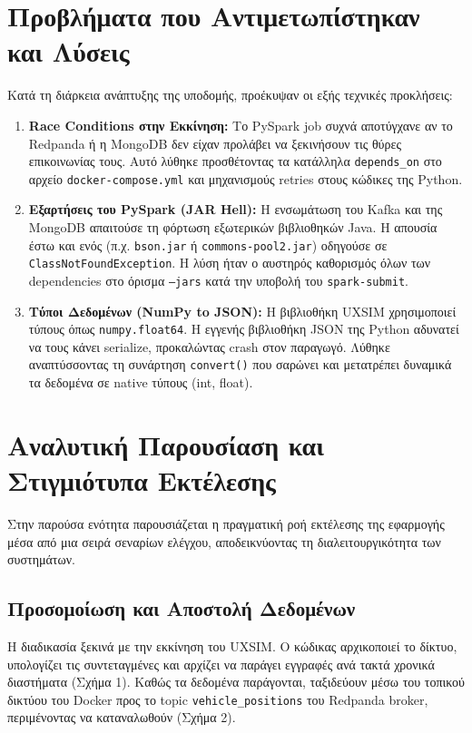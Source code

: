 \documentclass[11pt,a4paper]{article}
\begin{document}
\section{Προβλήματα που Αντιμετωπίστηκαν και Λύσεις}
Κατά τη διάρκεια ανάπτυξης της υποδομής, προέκυψαν οι εξής τεχνικές προκλήσεις:
\begin{enumerate}
    \item \textbf{Race Conditions στην Εκκίνηση:} Το PySpark job συχνά αποτύγχανε αν το Redpanda ή η MongoDB δεν είχαν προλάβει να ξεκινήσουν τις θύρες επικοινωνίας τους. Αυτό λύθηκε προσθέτοντας τα κατάλληλα \texttt{depends\_on} στο αρχείο \texttt{docker-compose.yml} και μηχανισμούς retries στους κώδικες της Python.
    \item \textbf{Εξαρτήσεις του PySpark (JAR Hell):} Η ενσωμάτωση του Kafka και της MongoDB απαιτούσε τη φόρτωση εξωτερικών βιβλιοθηκών Java. Η απουσία έστω και ενός (π.χ. \texttt{bson.jar} ή \texttt{commons-pool2.jar}) οδηγούσε σε \texttt{ClassNotFoundException}. Η λύση ήταν ο αυστηρός καθορισμός όλων των dependencies στο όρισμα \texttt{--jars} κατά την υποβολή του \texttt{spark-submit}.
    \item \textbf{Τύποι Δεδομένων (NumPy to JSON):} Η βιβλιοθήκη UXSIM χρησιμοποιεί τύπους όπως \texttt{numpy.float64}. Η εγγενής βιβλιοθήκη JSON της Python αδυνατεί να τους κάνει serialize, προκαλώντας crash στον παραγωγό. Λύθηκε αναπτύσσοντας τη συνάρτηση \texttt{convert()} που σαρώνει και μετατρέπει δυναμικά τα δεδομένα σε native τύπους (int, float).
\end{enumerate}

\section{Αναλυτική Παρουσίαση και Στιγμιότυπα Εκτέλεσης}
Στην παρούσα ενότητα παρουσιάζεται η πραγματική ροή εκτέλεσης της εφαρμογής μέσα από μια σειρά σεναρίων ελέγχου, αποδεικνύοντας τη διαλειτουργικότητα των συστημάτων.

\subsection{Προσομοίωση και Αποστολή Δεδομένων}
Η διαδικασία ξεκινά με την εκκίνηση του UXSIM. Ο κώδικας αρχικοποιεί το δίκτυο, υπολογίζει τις συντεταγμένες και αρχίζει να παράγει εγγραφές ανά τακτά χρονικά διαστήματα (Σχήμα 1). Καθώς τα δεδομένα παράγονται, ταξιδεύουν μέσω του τοπικού δικτύου του Docker προς το topic \texttt{vehicle\_positions} του Redpanda broker, περιμένοντας να καταναλωθούν (Σχήμα 2).
\end{document}
